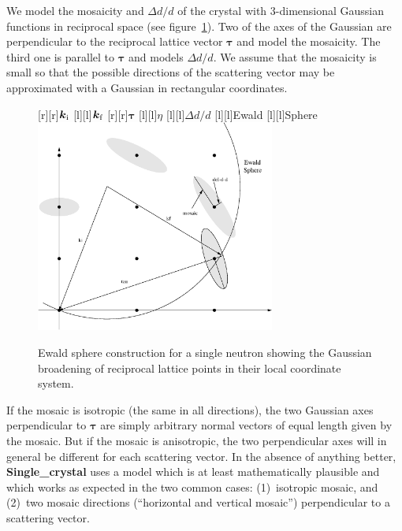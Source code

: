 We model the mosaicity and $\Delta d/d$ of the crystal with
3-dimensional Gaussian functions in reciprocal space (see
figure~\ref{fig:crystal-reciprocal-space}). Two of the axes of the
Gaussian are perpendicular to the reciprocal lattice vector $\boldsymbol{\tau}$ and model
the mosaicity. The third one is parallel to $\boldsymbol{\tau}$ and models
$\Delta d/d$. We assume that the
mosaicity is small so that the possible directions of the scattering
vector may be approximated with a Gaussian in rectangular
coordinates.
\begin{figure}[t]
  \begin{center}
    [r][r]{$\boldsymbol{k}_{\rm i}$}
    [l][l]{$\boldsymbol{k}_{\rm f}$}
    [r][r]{$\boldsymbol{\tau}$}
    [l][l]{$\eta$}
    [l][l]{$\Delta d/d$}
    [l][l]{Ewald}
    [l][l]{Sphere}
    \includegraphics[width=0.7\textwidth]{figures/recip_space3.eps}
  \end{center}
\caption{Ewald sphere construction for a single neutron showing the
    Gaussian broadening of reciprocal lattice points in their local
    coordinate system.}
\label{fig:crystal-reciprocal-space}
\end{figure}

If the mosaic is isotropic (the same in all directions), the two
Gaussian axes perpendicular to $\boldsymbol{\tau}$ are simply arbitrary
normal vectors of equal length given by the mosaic. But if the mosaic
is anisotropic, the two perpendicular axes will in general be different
for each scattering vector. In the absence of anything better,
{\bf Single\_crystal} uses a model which is at least mathematically
plausible and which works as expected in the two common cases:
(1)~isotropic mosaic, and (2)~two mosaic directions (``horizontal and
vertical mosaic'') perpendicular to a scattering vector.

